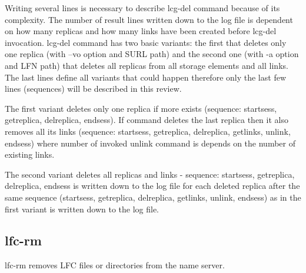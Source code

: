 \documentclass[a4paper, 11pt]{article} %
\begin{document}
Writing several lines is necessary to describe lcg-del command because of its complexity. The number of result lines written down to the log file is dependent on how many replicas and how many links have been created before lcg-del invocation. lcg-del command has two basic variants: the first that deletes only one replica (with --vo option and SURL path) and the second one (with -a option and LFN path) that deletes all replicas from all storage elements and all links. The last lines define all variants that could happen therefore only the last few lines (sequences) will be described in this review.

The first variant deletes only one replica if more exists (sequence: startsess, getreplica, delreplica, endsess). If command deletes the last  replica then it also removes all its links (sequence: startsess, getreplica, delreplica, getlinks, unlink, endsess) where number of invoked unlink command is depends on the number of existing links.

The second variant deletes all replicas and links - sequence: startsess, getreplica, delreplica, endsess is written down to the log file for each deleted replica after the same sequence (startsess, getreplica, delreplica, getlinks, unlink, endsess) as in the first variant is written down to the log file.

\subsection{lfc-rm}

lfc-rm removes LFC files or directories from the name server.
\end{document}
